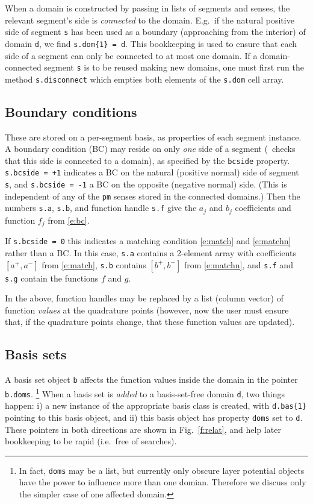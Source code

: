 \documentclass[12pt]{article}
\begin{document}
When a domain is constructed by passing in lists of segments
and senses, the relevant segment's side is {\em connected} to the domain.
E.g.\ if the natural positive side of segment {\tt s} has been used
as a boundary (approaching from the interior) of domain {\tt d},
we find {\tt s.dom\{1\} = d}.
This bookkeeping is used to ensure that each side of a segment
can only be connected to at most one domain.
If a domain-connected segment {\tt s} is to be reused making new domains,
one must first run the method {\tt s.disconnect}
which empties both elements of the {\tt s.dom} cell array.


\subsection{Boundary conditions}

These are stored on a per-segment basis, as properties of each segment
instance. A boundary condition (BC) may reside on only {\em one} side of a
segment (\mpspack\ checks that this side is connected to a domain),
as specified by the {\tt bcside} property.
{\tt s.bcside = +1} indicates a BC on the natural (positive
normal) side of segment {\tt s}, and {\tt s.bcside = -1} a BC on the
opposite (negative normal) side.
(This is independent of any of the {\tt pm} senses stored in the connected
domains.)
Then the numbers {\tt s.a}, {\tt s.b},
and function handle {\tt s.f} give the
$a_j$ and $b_j$ coefficients and function $f_j$ from \eqref{e:bc}.

If {\tt s.bcside = 0} this indicates a matching condition
\eqref{e:match} and \eqref{e:matchn} rather than a BC. In this case,
{\tt s.a} contains a 2-element array with coefficients
$[a^+, a^-]$ from \eqref{e:match}, {\tt s.b} contains
$[b^+, b^-]$ from \eqref{e:matchn},
and {\tt s.f} and {\tt s.g} contain the functions $f$ and $g$.

In the above, function handles may be replaced by a list (column vector)
of function {\em values}
at the quadrature points (however, now the user must ensure that, if
the quadrature points change, that these function values are updated).


\subsection{Basis sets}

A basis set object {\tt b} affects the
function values inside the domain in the pointer {\tt b.doms}.%
  \footnote{In fact, {\tt doms} may be a list, but currently only obscure
    layer potential objects have the power to influence more than
    one domian. Therefore we discuss only the simpler
    case of one affected domain.}
When a basis set is {\em added} to a basis-set-free domain {\tt d},
two things happen: i) a new instance of the appropriate basis class
is created, with {\tt d.bas\{1\}} pointing to this basis object,
and ii) this basis object has property {\tt doms} set to {\tt d}.
These pointers in both directions are shown in Fig.~\ref{f:relat},
and help later bookkeeping to be rapid (i.e.\ free of searches).
\end{document}
